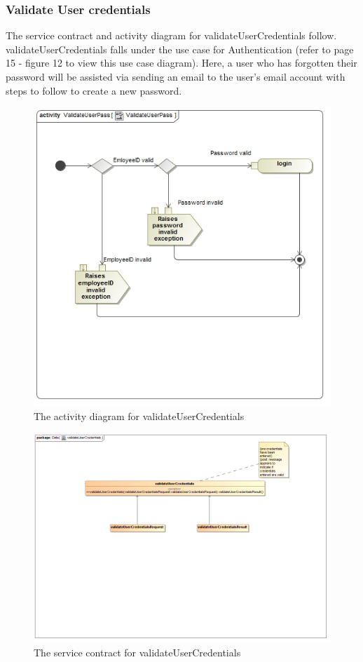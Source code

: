 \documentclass[a4paper,12pt]{article}
\begin{document}
\subsubsection{Validate User credentials }
The service contract and activity diagram for validateUserCredentials follow. validateUserCredentials falls under the use case for Authentication (refer to page 15 - figure 12 to view this use case diagram). Here, a user who has forgotten their password will be assisted via sending an email to the user's email account with steps to follow to create a new password.
\begin{figure}[H]
  \centering
    \includegraphics[width=1.0\textwidth]{../images/ValidateUserPass.jpg}
    \caption{The activity diagram for validateUserCredentials} 
\end{figure}
\begin{figure}[H]
  \centering
    \includegraphics[width=1.0\textwidth]{../images/validateUserCredentials.png}
    \caption{The service contract for validateUserCredentials} 
\end{figure}
\end{document}
